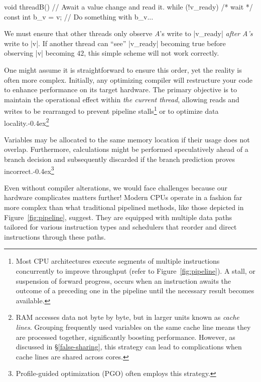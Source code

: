 \documentclass[fontsize=10pt, oneside]{scrartcl}
\newcommand{\punckern}{\kern-0.4ex}
\newcommand{\cplusplus}[1]{C\kern-0.1ex\raisebox{0.15ex}{\texttt{++}}}
\newcommand{\fig}[1]{Figure~\ref{#1}}
\newcommand{\introduce}[1]{\textit{#1}}
\newcommand{\secref}[1]{\hyperref[#1]{\textsc{\S}\ref*{#1}}}
\begin{document}
\begin{ccode}
void threadB()
{
    // Await a value change and read it.
    while (!v_ready) { /* wait */ }
    const int b_v = v;
    // Do something with b_v...
}
\end{ccode}
We must ensure that other threads only observe \textit{A}'s write to \cc|v_ready| \emph{after A's} write to \cc|v|.
If another thread can ``see'' \cc|v_ready| becoming true before observing \cc|v| becoming $42$,
this simple scheme will not work correctly.

One might assume it is straightforward to ensure this order,
yet the reality is often more complex.
Initially, any optimizing compiler will restructure your code to enhance performance on its target hardware.
The primary objective is to maintain the operational effect within \emph{the current thread},
allowing reads and writes to be rearranged to prevent pipeline stalls\footnote{%
Most \textsc{CPU} architectures execute segments of multiple instructions concurrently to improve throughput (refer to \fig{fig:pipeline}).
A stall, or suspension of forward progress, occurs when an instruction awaits the outcome of a preceding one in the pipeline until the necessary result becomes available.} or to optimize data locality.\punckern\footnote{%
\textsc{RAM} accesses data not byte by byte, but in larger units known as \introduce{cache lines}.
Grouping frequently used variables on the same cache line means they are processed together,
significantly boosting performance. However, as discussed in \secref{false-sharing},
this strategy can lead to complications when cache lines are shared across cores.}

Variables may be allocated to the same memory location if their usage does not overlap.
Furthermore, calculations might be performed speculatively ahead of a branch decision and subsequently discarded if the branch prediction proves incorrect.\punckern\footnote{%
Profile-guided optimization (PGO) often employs this strategy.}

Even without compiler alterations,
we would face challenges because our hardware complicates matters further!
Modern \textsc{CPU}s operate in a fashion far more complex than what traditional pipelined methods,
like those depicted in \fig{fig:pipeline}, suggest.
They are equipped with multiple data paths tailored for various instruction types and schedulers that reorder and direct instructions through these paths.
\end{document}
